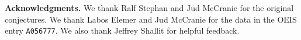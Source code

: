 \documentclass[12pt, twoside]{amsart}
\newtheorem{proposition}[theorem]{Proposition}
\newtheorem{remark}[theorem]{Remark}
\theoremstyle{definition}
\begin{document}
\bigskip
\noindent \textbf{Acknowledgments.} We thank Ralf Stephan and Jud McCranie for the original conjectures. We thank Labos Elemer and Jud McCranie for the data in the OEIS entry \texttt{A056777}. We also thank Jeffrey Shallit for helpful feedback. 









\end{document}

